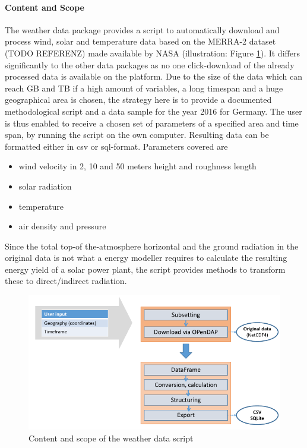 \documentclass[article]{elsarticle}
\begin{document}
\paragraph{Content and Scope}
The weather data package provides a script to automatically download and process wind, solar and temperature data based on the MERRA-2 dataset (TODO REFERENZ) made available by NASA (illustration: Figure \ref{fig:weather data}). It differs significantly to the other data packages as no one click-download of the already processed data is available on the platform. Due to the size of the data which can reach GB and TB if a high amount of variables, a long timespan and a huge geographical area is chosen, the strategy here is to provide a documented methodological script and a data sample for the year 2016 for Germany. The user is thus enabled to receive a chosen set of parameters of a specified area and time span, by running the script on the own computer. Resulting data can be formatted either in csv or sql-format. Parameters covered are
\begin{itemize}
 \item wind velocity in 2, 10 and 50 meters height and roughness length
 \item solar radiation
 \item temperature
 \item air density and pressure
\end{itemize}

Since the total top-of the-atmosphere horizontal and the ground radiation in the original data is not what a energy modeller requires to calculate the resulting energy yield of a solar power plant, the script provides methods to transform these to direct/indirect radiation.

\begin{figure}[!h]
    \centering
    \includegraphics[width=1\textwidth]{figures/weather_data.png}
    \caption{Content and scope of the weather data script}
    \label{fig:weather data}
\end{figure}
\end{document}
